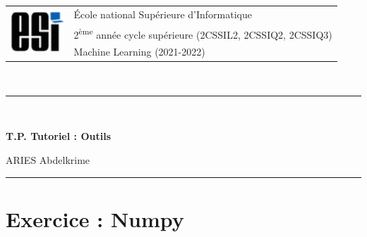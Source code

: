 \documentclass[11pt, a4paper]{article}
\begin{document}

\noindent
\begin{tabular}{ll}
\multirow{3}{*}{\includegraphics[width=2cm]{../img/esi-logo.png}} & \'Ecole national Supérieure d'Informatique\\
& 2\textsuperscript{ème} année cycle supérieure (2CSSIL2, 2CSSIQ2, 2CSSIQ3)\\
& Machine Learning (2021-2022)
\end{tabular}\\[.25cm]
\noindent\rule{\textwidth}{1pt}\\%
\begin{center}
{\LARGE \textbf{T.P. Tutoriel : Outils}}
\begin{flushright}
	ARIES Abdelkrime
\end{flushright}
\end{center}
\noindent\rule{\textwidth}{1pt}

\section*{Exercice : Numpy}

\end{document}
